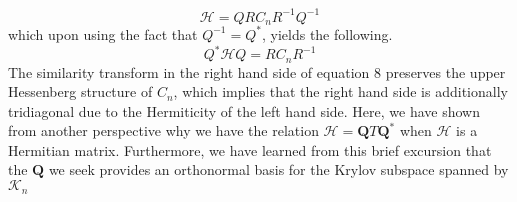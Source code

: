 \documentclass[12pt]{article} %
\begin{document}
\begin{equation}
    \mathcal{H} = QR C_n R^{-1}Q^{-1} 
\end{equation}
which upon using the fact that $Q^{-1} = Q^*$, yields the following.
\begin{equation}
    Q^*\mathcal{H} Q = R C_n R^{-1}
\end{equation}
The similarity transform in the right hand side of equation 8 preserves the upper Hessenberg structure of $C_n$, which implies that the right hand side is additionally tridiagonal due to the Hermiticity of the left hand side. Here, we have shown from another perspective why we have the relation $\mathcal{H} = \textbf{Q} T \textbf{Q}^*$ when $\mathcal{H}$ is a Hermitian matrix. Furthermore, we have learned from this brief excursion that the $\textbf{Q}$ we seek provides an orthonormal basis for the Krylov subspace spanned by $\mathcal{K}_n$
\end{document}

